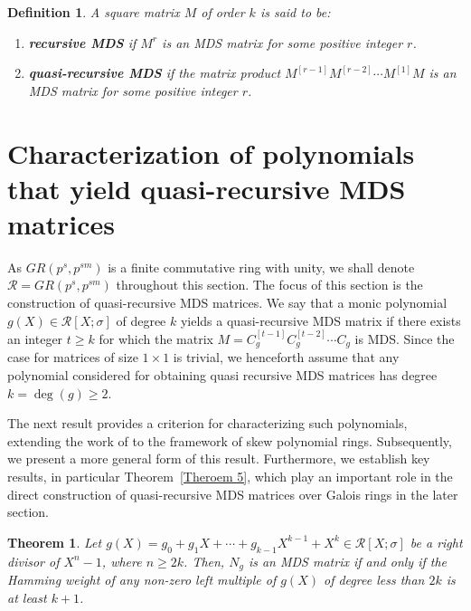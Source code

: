 \documentclass[11pt]{article}
\newtheorem{theorem}{Theorem}
\newtheorem{definition}{Definition}
\begin{document}
\begin{definition} 
A square matrix $M$ of order $k$ is said to be: 
\begin{enumerate} 
    \item[\textnormal{(i)}] \textbf{recursive MDS} if  $M^r$ is an MDS matrix for some positive integer $r$.
    \item[\textnormal{(ii)}] \textbf{quasi-recursive MDS} if the matrix product $M^{[r-1]} M^{{[r-2]}} \cdots M^{[1]} M$ is an MDS matrix for some positive integer $r$.
\end{enumerate}  
\end{definition}

\section{Characterization of polynomials that yield quasi-recursive MDS matrices}\label{Sec:polynomial-charac}

As $GR(p^s, p^{sm})$ is a finite commutative ring with unity, we shall denote $\mathcal{R} = GR(p^s, p^{sm})$ throughout this section. The focus of this section is the construction of quasi-recursive MDS matrices. We say that a monic polynomial $g(X) \in \mathcal{R}[X;\sigma]$ of degree $k$ yields a  quasi-recursive MDS matrix if there exists an integer $t \geq k$ for which 
the matrix
\(
M = C_g^{[t-1]} C_g^{[t-2]} \cdots C_g
\)
is  MDS. Since the case for matrices of size $1 \times 1$ is trivial, 
we henceforth assume that any polynomial considered for obtaining quasi 
recursive MDS matrices has degree $k = \deg(g) \geq 2$.

The next result provides a criterion for characterizing such polynomials, extending the work of \cite[Theorem~1]{Guptadirect} to the framework of skew polynomial rings. Subsequently, we present a more general form of this result. Furthermore, we establish key results, in particular Theorem~\ref{Theroem 5}, which play an important role in the direct construction of quasi-recursive MDS matrices over Galois rings in the later section.


 


\begin{theorem}\label{Weightthm1} Let  \(g(X)=g_0+g_1X+\cdots+g_{k-1}X^{k-1}+X^k\in \mathcal{R}[X;\sigma]\) be a right divisor of $X^{n}-1$, where $n\geq 2k$. Then,   $N_g$ is an MDS matrix if and only if the Hamming weight of any non-zero left multiple of $g(X)$ of degree less than $2k$ is at least $k+1$. \end{theorem}
\end{document}

